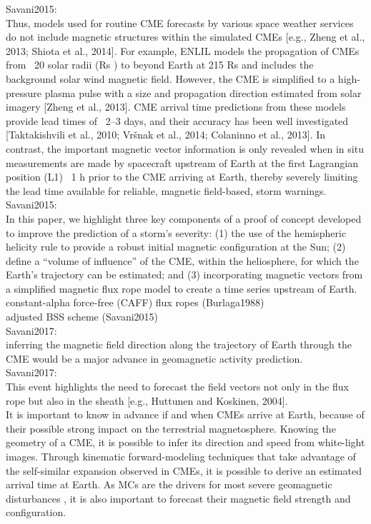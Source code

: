 Savani2015:\\
Thus, models used for routine CME forecasts by various space weather services do not include magnetic structures within the simulated CMEs [e.g., Zheng et al., 2013; Shiota et al., 2014]. For example, ENLIL models the propagation of CMEs from ~20 solar radii (Rs ) to beyond Earth at 215 Rs and includes the background solar wind magnetic field. However, the CME is simplified to a high-pressure plasma pulse with a size and propagation direction estimated from solar imagery [Zheng et al., 2013]. CME arrival time predictions from these models provide lead times of ~2–3 days, and their accuracy has been well investigated [Taktakishvili et al., 2010; Vršnak et al., 2014; Colaninno et al., 2013]. In contrast, the important magnetic vector information is only revealed when in situ measurements are made by spacecraft upstream of Earth at the first Lagrangian position (L1) ~1 h prior to the CME arriving at Earth, thereby severely limiting the lead time available for reliable, magnetic field-based, storm warnings.\\
Savani2015:\\
In this paper, we highlight three key components of a proof of concept developed to improve the prediction of a storm’s severity: (1) the use of the hemispheric helicity rule to provide a robust initial magnetic configuration at the Sun; (2) define a “volume of influence” of the CME, within the heliosphere, for which the Earth’s trajectory can be estimated; and (3) incorporating magnetic vectors from a simplified magnetic flux rope model to create a time series upstream of Earth.\\


constant-alpha force-free (CAFF) flux ropes (Burlaga1988)\\

adjusted BSS scheme (Savani2015)\\

Savani2017:\\
inferring the magnetic field direction along the trajectory of Earth through the CME would be a major advance in geomagnetic activity prediction.\\

Savani2017:\\
This event highlights the need to forecast the field vectors not only in the flux rope but also in the sheath [e.g., Huttunen and Koskinen, 2004].\\


It is important to know in advance if and when CMEs arrive at Earth, because of their possible strong impact on the terrestrial magnetosphere. Knowing the geometry of a CME, it is possible to infer its direction and speed from white-light images. Through kinematic forward-modeling techniques that take advantage of the self-similar expansion observed in CMEs, it is possible to derive an estimated arrival time at Earth. As MCs are the drivers for most severe geomagnetic disturbances \citep{Bothmer1995,Cane2003}, it is also important to forecast their magnetic field strength and configuration.


